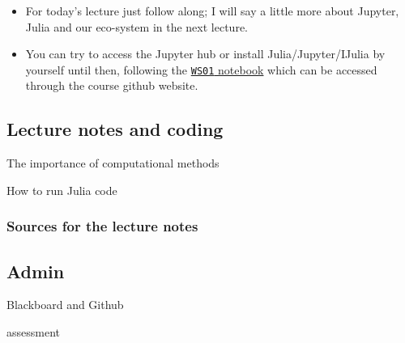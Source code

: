 \documentclass[12pt,a4paper]{article}
\begin{document}
\begin{itemize}
\item For today's lecture just follow along; I will say a little more about Jupyter, Julia and our eco-system in the next lecture.


\item You can try to access the Jupyter hub or install Julia/Jupyter/IJulia by yourself until then, following the \href{WS01-Installing-Julia.ipynb}{\texttt{WS01} notebook} which can be accessed through the course github website.

\end{itemize}
\subsection{Lecture notes and coding}
The importance of computational methods

How to run Julia code

\subsubsection{Sources for the lecture notes}
\subsection{Admin}
Blackboard and Github

assessment


\begin{lstlisting}

\end{lstlisting}
\end{document}
